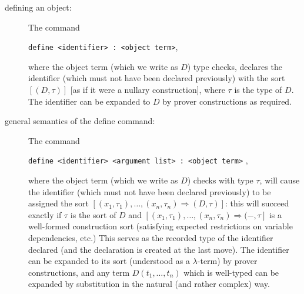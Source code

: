 \documentclass[12pt]{article}
\begin{document}
\begin{description}
\item[defining an object:]  The command \begin{center}{\tt define <identifier> : <object term>},\end{center} where the object term (which we write as $D$)  type checks, declares the identifier (which must not have been declared previously)  with the sort $[(D,\tau)]$ [as if it were a nullary construction],
where $\tau$ is the type of $D$.   The identifier can be expanded to $D$ by prover constructions as required. 

\item[general semantics of the define command:]  The command \begin{center}{\tt define <identifier> <argument list> : <object term>} ,\end{center} where the object term  (which we write  as $D$) checks with type $\tau$,
will cause the identifier (which must  not have been declared previously)  to be assigned the sort $[(x_1,\tau_1),\ldots,(x_n,\tau_n) \Rightarrow (D,\tau)]$:  this will succeed exactly if $\tau$ is the sort of $D$ and $[(x_1,\tau_1),\ldots,(x_n,\tau_n) \Rightarrow (-,\tau]$ is a well-formed construction sort (satisfying expected restrictions on variable dependencies, etc.)  This serves as the recorded type of the identifier
declared (and the declaration is created at the last move).  The identifier can be expanded to its sort (understood as a $\lambda$-term) by prover constructions,
and any term $D(t_1,\ldots,t_n)$ which is well-typed can be expanded by substitution in the natural (and rather complex) way.


\end{description}
\end{document}

